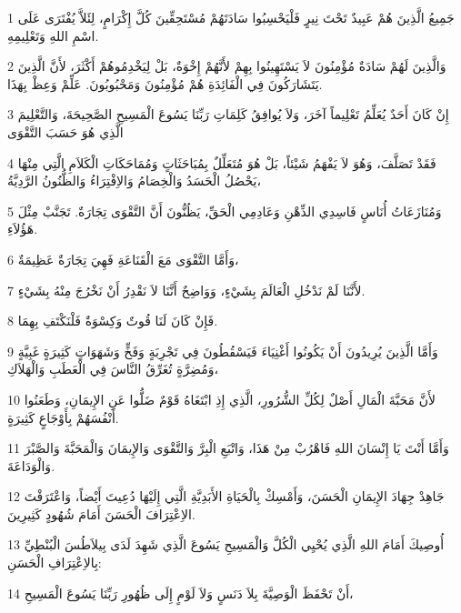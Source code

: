 \par 1 جَمِيعُ الَّذِينَ هُمْ عَبِيدٌ تَحْتَ نِيرٍ فَلْيَحْسِبُوا سَادَتَهُمْ مُسْتَحِقِّينَ كُلَّ إِكْرَامٍ، لِئَلاَّ يُفْتَرَى عَلَى اسْمِ اللهِ وَتَعْلِيمِهِ.
\par 2 وَالَّذِينَ لَهُمْ سَادَةٌ مُؤْمِنُونَ لاَ يَسْتَهِينُوا بِهِمْ لأَنَّهُمْ إِخْوَةٌ، بَلْ لِيَخْدِمُوهُمْ أَكْثَرَ، لأَنَّ الَّذِينَ يَتَشَارَكُونَ فِي الْفَائِدَةِ هُمْ مُؤْمِنُونَ وَمَحْبُوبُونَ. عَلِّمْ وَعِظْ بِهَذَا.
\par 3 إِنْ كَانَ أَحَدٌ يُعَلِّمُ تَعْلِيماً آخَرَ، وَلاَ يُوافِقُ كَلِمَاتِ رَبِّنَا يَسُوعَ الْمَسِيحِ الصَّحِيحَةَ، وَالتَّعْلِيمَ الَّذِي هُوَ حَسَبَ التَّقْوَى
\par 4 فَقَدْ تَصَلَّفَ، وَهُوَ لاَ يَفْهَمُ شَيْئاً، بَلْ هُوَ مُتَعَلِّلٌ بِمُبَاحَثَاتٍ وَمُمَاحَكَاتِ الْكَلاَمِ الَّتِي مِنْهَا يَحْصُلُ الْحَسَدُ وَالْخِصَامُ وَالاِفْتِرَاءُ وَالظُّنُونُ الرَّدِيَّةُ،
\par 5 وَمُنَازَعَاتُ أُنَاسٍ فَاسِدِي الذِّهْنِ وَعَادِمِي الْحَقِّ، يَظُنُّونَ أَنَّ التَّقْوَى تِجَارَةٌ. تَجَنَّبْ مِثْلَ هَؤُلاَءِ.
\par 6 وَأَمَّا التَّقْوَى مَعَ الْقَنَاعَةِ فَهِيَ تِجَارَةٌ عَظِيمَةٌ،
\par 7 لأَنَّنَا لَمْ نَدْخُلِ الْعَالَمَ بِشَيْءٍ، وَوَاضِحٌ أَنَّنَا لاَ نَقْدِرُ أَنْ نَخْرُجَ مِنْهُ بِشَيْءٍ.
\par 8 فَإِنْ كَانَ لَنَا قُوتٌ وَكِسْوَةٌ فَلْنَكْتَفِ بِهِمَا.
\par 9 وَأَمَّا الَّذِينَ يُرِيدُونَ أَنْ يَكُونُوا أَغْنِيَاءَ فَيَسْقُطُونَ فِي تَجْرِبَةٍ وَفَخٍّ وَشَهَوَاتٍ كَثِيرَةٍ غَبِيَّةٍ وَمُضِرَّةٍ تُغَرِّقُ النَّاسَ فِي الْعَطَبِ وَالْهَلاَكِ،
\par 10 لأَنَّ مَحَبَّةَ الْمَالِ أَصْلٌ لِكُلِّ الشُّرُورِ، الَّذِي إِذِ ابْتَغَاهُ قَوْمٌ ضَلُّوا عَنِ الإِيمَانِ، وَطَعَنُوا أَنْفُسَهُمْ بِأَوْجَاعٍ كَثِيرَةٍ.
\par 11 وَأَمَّا أَنْتَ يَا إِنْسَانَ اللهِ فَاهْرُبْ مِنْ هَذَا، وَاتْبَعِ الْبِرَّ وَالتَّقْوَى وَالإِيمَانَ وَالْمَحَبَّةَ وَالصَّبْرَ وَالْوَدَاعَةَ.
\par 12 جَاهِدْ جِهَادَ الإِيمَانِ الْحَسَنَ، وَأَمْسِكْ بِالْحَيَاةِ الأَبَدِيَّةِ الَّتِي إِلَيْهَا دُعِيتَ أَيْضاً، وَاعْتَرَفْتَ الاِعْتِرَافَ الْحَسَنَ أَمَامَ شُهُودٍ كَثِيرِينَ.
\par 13 أُوصِيكَ أَمَامَ اللهِ الَّذِي يُحْيِي الْكُلَّ وَالْمَسِيحِ يَسُوعَ الَّذِي شَهِدَ لَدَى بِيلاَطُسَ الْبُنْطِيِّ بِالاِعْتِرَافِ الْحَسَنِ:
\par 14 أَنْ تَحْفَظَ الْوَصِيَّةَ بِلاَ دَنَسٍ وَلاَ لَوْمٍ إِلَى ظُهُورِ رَبِّنَا يَسُوعَ الْمَسِيحِ،

